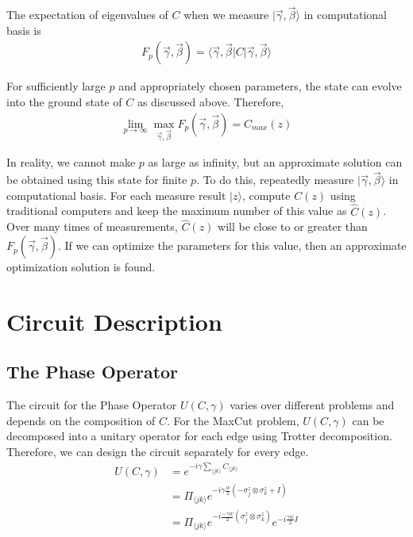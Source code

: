 \documentclass{./source/Report}
\begin{document}
The expectation of eigenvalues of $C$ when we measure $|\vec{\gamma},\vec{\beta}\rangle$ in computational basis is
\begin{align*}
    F_p(\vec{\gamma}, \vec{\beta}) = \langle\vec{\gamma},\vec{\beta}| C |\vec{\gamma},\vec{\beta}\rangle
\end{align*}

For sufficiently large $p$ and appropriately chosen parameters, the state can evolve into the ground state
of $C$ as discussed above. Therefore, 
\begin{align*}
    \lim_{p\rightarrow \infty}\max_{\vec{\gamma}, \vec{\beta}}{F_p(\vec{\gamma}, \vec{\beta})}=C_{max}(z)
\end{align*}

In reality, we cannot make $p$ as large as infinity, but an approximate solution can be obtained using this 
state for finite $p$. To do this, repeatedly measure $|\vec{\gamma}, \vec{\beta}\rangle$ in computational basis. For each measure 
result $\vert z \rangle$, compute $C(z)$ using traditional computers and keep the maximum number of this value as $\hat{C}(z)$. Over many 
times of measurements, $\hat{C}(z)$ will be close to or greater than $ F_p(\vec{\gamma}, \vec{\beta})$. If we can optimize 
the parameters for this value, then an approximate optimization solution is found.


\section{Circuit Description}

\subsection{The Phase Operator}

The circuit for the Phase Operator $U(C, \gamma)$ varies over different problems and depends on the composition of $C$. 
For the MaxCut problem, $U(C, \gamma)$ can be decomposed into a unitary operator for each edge using Trotter decomposition.
Therefore, we can design the circuit separately for every edge.
\begin{align*}
    U(C, \gamma) &= e^{-i\gamma\sum_{\langle jk\rangle}C_{\langle jk\rangle}}\\
    &=\Pi_{\langle jk\rangle}e^{-i\gamma \frac{w}{2}(-\sigma_j^z\otimes\sigma_k^z+I)}\\
    &=\Pi_{\langle jk\rangle}e^{-i\frac{-\gamma w}{2}(\sigma_j^z\otimes\sigma_k^z)}e^{-i\frac{\gamma w}{2}I}
\end{align*}
\end{document}
